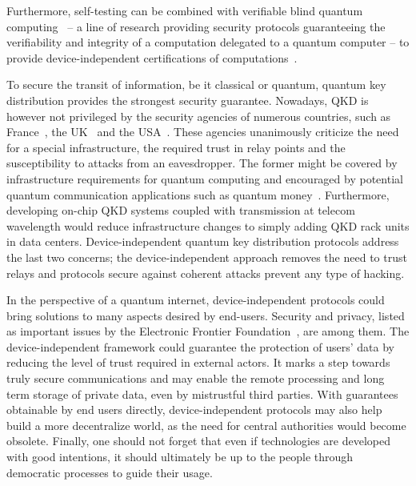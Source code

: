 Furthermore, self-testing can be combined with verifiable blind quantum computing~\cite{Fitzsimons2017,Eisert2020} -- a line of research providing security protocols guaranteeing the verifiability and integrity of a computation delegated to a quantum computer -- to provide device-independent certifications of computations~\cite{Reichardt2013,Gheorghiu2015,Hajdusek2015,McKague2016}.

\medbreak

To secure the transit of information, be it classical or quantum, quantum key distribution provides the strongest security guarantee.
Nowadays, QKD is however not privileged by the security agencies of numerous countries, such as France~\cite{ANSSI2020}, the UK~\cite{NCSC2020} and the USA~\cite{NSA2020}.
These agencies unanimously criticize the need for a special infrastructure, the required trust in relay points and the susceptibility to attacks from an eavesdropper.
The former might be covered by infrastructure requirements for quantum computing and encouraged by potential quantum communication applications such as quantum money~\cite{Wiesner1983,Molina2013}.
Furthermore, developing on-chip QKD systems coupled with transmission at telecom wavelength would reduce infrastructure changes to simply adding QKD rack units in data centers. 
Device-independent quantum key distribution protocols address the last two concerns; the device-independent approach removes the need to trust relays and protocols secure against coherent attacks prevent any type of hacking.

\medbreak

In the perspective of a quantum internet, device-independent protocols could bring solutions to many aspects desired by end-users.
Security and privacy, listed as important issues by the Electronic Frontier Foundation~\cite{EFFPrivacy,EFFSecurity}, are among them.
The device-independent framework could guarantee the protection of users' data by reducing the level of trust required in external actors.
It marks a step towards truly secure communications and may enable the remote processing and long term storage of private data, even by mistrustful third parties.
With guarantees obtainable by end users directly, device-independent protocols may also help build a more decentralize world, as the need for central authorities would become obsolete.
Finally, one should not forget that even if technologies are developed with good intentions, it should ultimately be up to the people through democratic processes to guide their usage.
